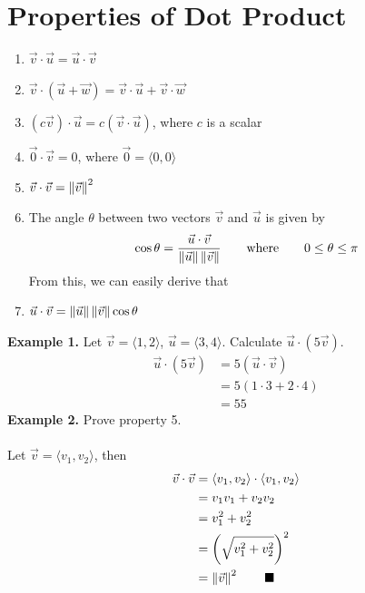 \section*{Properties of Dot Product}
\begin{enumerate}[leftmargin=*]
    \item $\vec{v} \cdot \vec{u} = \vec{u} \cdot \vec{v}$
    \item $\vec{v} \cdot (\vec{u} + \vec{w}) = \vec{v} \cdot \vec{u} + \vec{v} \cdot \vec{w}$
    \item $(c\vec{v}) \cdot \vec{u} = c(\vec{v} \cdot \vec{u})$, where $c$ is a scalar
    \item $\vec{0}\cdot\vec{v} = 0$, where $\vec{0} = \langle 0, 0 \rangle$
    \item $\vec{v} \cdot \vec{v} = \left\lVert\vec{v}\right\rVert^2$
    \item The angle $\theta$ between two vectors $\vec{v}$ and $\vec{u}$ is given by \[\cos\theta = \frac{\vec{u} \cdot \vec{v}}{\left\lVert\vec{u}\right\rVert \left\lVert\vec{v}\right\rVert} \qquad \text{where} \qquad 0 \leq \theta \leq \pi\]
          From this, we can easily derive that
    \item $\vec{u} \cdot \vec{v} = \left\lVert\vec{u}\right\rVert \left\lVert\vec{v}\right\rVert \cos\theta$
\end{enumerate}
\noindent\textbf{Example 1. } Let $\vec{v} = \langle 1, 2 \rangle$, $\vec{u} = \langle 3, 4 \rangle$. Calculate $\vec{u} \cdot (5\vec{v})$.
\begin{align*}
    \vec{u} \cdot (5\vec{v}) & = 5(\vec{u} \cdot \vec{v}) \\
                             & = 5(1 \cdot 3 + 2 \cdot 4) \\
                             & = 55
\end{align*}
\noindent\textbf{Example 2. } Prove property 5.
\\\\
\noindent Let $\vec{v} = \langle v_1, v_2 \rangle$, then
\begin{align*}
    \vec{v} \cdot \vec{v} & = \langle v_1, v_2 \rangle \cdot \langle v_1, v_2 \rangle \\
                          & = v_1v_1 + v_2v_2                                         \\
                          & = v_1^2 + v_2^2                                           \\
                          & = \left(\sqrt{v_1^2 + v_2^2}\right)^2                     \\
                          & = \left\lVert\vec{v}\right\rVert^2 \qquad \blacksquare
\end{align*}
